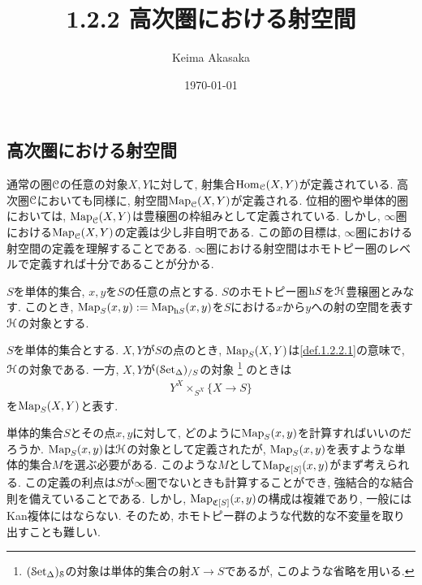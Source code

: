 \documentclass[uplatex, a4paper, 14Q, dvipdfmx]{jsreport}
\title{1.2.2 高次圏における射空間}
\author{Keima Akasaka}
\date{\today}
\begin{document}

\setcounter{chapter}{1}
\setcounter{section}{2} 
\setcounter{subsection}{1}   
\setcounter{subsubsection}{1}

\subsection{高次圏における射空間}

通常の圏$\mathcal{C}$の任意の対象$X,Y$に対して, 射集合$\mathrm{Hom}_{\mathcal{C}}(X,Y)$が定義されている. 
高次圏$\mathcal{C}$においても同様に, 射空間$\mathrm{Map}_{\mathcal{C}}(X,Y)$が定義される. 
位相的圏や単体的圏においては, $\mathrm{Map}_{\mathcal{C}}(X,Y)$は豊穣圏の枠組みとして定義されている.
しかし, $\infty$圏における$\mathrm{Map}_{\mathcal{C}}(X,Y)$の定義は少し非自明である. 
この節の目標は, $\infty$圏における射空間の定義を理解することである. 
$\infty$圏における射空間はホモトピー圏のレベルで定義すれば十分であることが分かる. 

\begin{definition}[単体的集合の射空間] \label{def.1.2.2.1}
  $S$を単体的集合, $x,y$を$S$の任意の点とする. 
  $S$のホモトピー圏$\mathrm{h} S$を$\mathcal{H}$豊穣圏とみなす. 
  このとき, $\mathrm{Map}_S(x,y) := \mathrm{Map}_{\mathrm{h} S}(x,y)$を$S$における$x$から$y$への射の空間を表す$\mathcal{H}$の対象とする. 
\end{definition}

\begin{remark} \label{rem.1.2.2.2}
  $S$を単体的集合とする. 
  $X,Y$が$S$の点のとき, $\mathrm{Map}_S(X,Y)$は\cref{def.1.2.2.1}の意味で, $\mathcal{H}$の対象である. 
  一方, $X,Y$が$(\mathcal{S}\mathrm{et}_{\Delta})_{/S}$の対象
  \footnote{
    $ (\mathcal{S}\mathrm{et}_{\Delta})_{\mathcal{S}}$の対象は単体的集合の射$X \to S$であるが, このような省略を用いる. 
  }
  のときは
  \begin{align*}
    Y^X \times_{S^X} \{X \to S\}
  \end{align*}
  を$\mathrm{Map}_S(X,Y)$と表す.
\end{remark}

単体的集合$S$とその点$x,y$に対して, どのように$\mathrm{Map}_S(x,y)$を計算すればいいのだろうか. 
$\mathrm{Map}_S(x,y)$は$\mathcal{H}$の対象として定義されたが, $\mathrm{Map}_S(x,y)$を表すような単体的集合$M$を選ぶ必要がある.
このような$M$として$\mathrm{Map}_{\mathfrak{C}[S]}(x,y)$がまず考えられる.
この定義の利点は$S$が$\infty$圏でないときも計算することができ, 強結合的な結合則を備えていることである.
しかし, $\mathrm{Map}_{\mathfrak{C}[S]}(x,y)$の構成は複雑であり, 一般にはKan複体にはならない. 
そのため, ホモトピー群のような代数的な不変量を取り出すことも難しい. 
\end{document}
